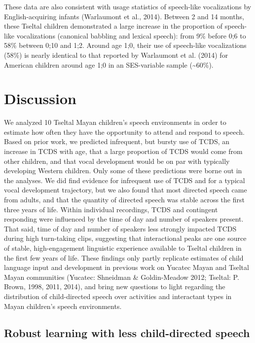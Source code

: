 \documentclass[floatsintext,man]{apa6}
\theoremstyle{definition}
\theoremstyle{definition}
\theoremstyle{definition}
\theoremstyle{remark}
\begin{document}
These data are also consistent with usage statistics of speech-like
vocalizations by English-acquiring infants (Warlaumont et al., 2014).
Between 2 and 14 months, these Tseltal children demonstrated a large
increase in the proportion of speech-like vocalizations (canonical
babbling and lexical speech): from 9\% before 0;6 to 58\% between 0;10
and 1;2. Around age 1;0, their use of speech-like vocalizations (58\%)
is nearly identical to that reported by Warlaumont et al. (2014) for
American children around age 1;0 in an SES-variable sample
(\textasciitilde{}60\%).

\section{Discussion}\label{disc}

We analyzed 10 Tseltal Mayan children's speech environments in order to
estimate how often they have the opportunity to attend and respond to
speech. Based on prior work, we predicted infrequent, but bursty use of
TCDS, an increase in TCDS with age, that a large proportion of TCDS
would come from other children, and that vocal development would be on
par with typically developing Western children. Only some of these
predictions were borne out in the analyses. We did find evidence for
infrequent use of TCDS and for a typical vocal development trajectory,
but we also found that most directed speech came from adults, and that
the quantity of directed speech was stable across the first three years
of life. Within individual recordings, TCDS and contingent responding
were influenced by the time of day and number of speakers present. That
said, time of day and number of speakers less strongly impacted TCDS
during high turn-taking clips, suggesting that interactional peaks are
one source of stable, high-engagement linguistic experience available to
Tseltal children in the first few years of life. These findings only
partly replicate estimates of child language input and development in
previous work on Yucatec Mayan and Tseltal Mayan communities (Yucatec:
Shneidman \& Goldin-Meadow 2012; Tseltal: P. Brown, 1998, 2011, 2014),
and bring new questions to light regarding the distribution of
child-directed speech over activities and interactant types in Mayan
children's speech environments.

\subsection{Robust learning with less child-directed
speech}\label{robust-learning-with-less-child-directed-speech}
\end{document}

